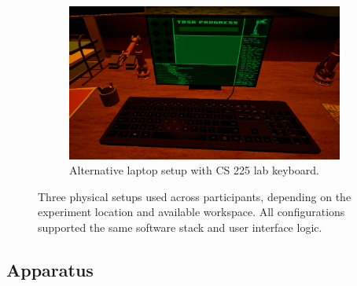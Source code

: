 \documentclass[acmlarge]{acmart}
\begin{document}
\begin{figure}[htbp]
    \hfill
    \begin{subfigure}[t]{0.3\linewidth}
        \centering
        \includegraphics[width=\linewidth]{keyboard2.png}
        \caption{Alternative laptop setup with CS 225 lab keyboard.}
        \label{fig:setup_laptop_white}
    \end{subfigure}

    \caption{Three physical setups used across participants, depending on the experiment location and available workspace. All configurations supported the same software stack and user interface logic.}
    \label{fig:setup_variants}
\end{figure}


\subsection{Apparatus}
\end{document}
